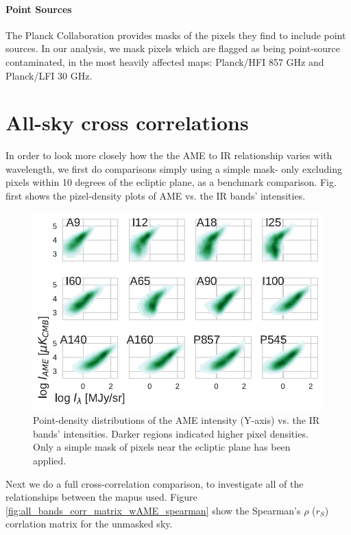      \paragraph{Point Sources}
       The Planck Collaboration provides masks of the pixels they find to include point sources. In our analysis, we mask pixels which are flagged as being point-source contaminated, in the most heavily affected maps: Planck/HFI 857 GHz and Planck/LFI 30 GHz.

  \section{All-sky cross correlations}

        In order to look more closely how the the AME to IR relationship varies with wavelength, we first do comparisons simply using a simple mask- only excluding pixels within 10 degrees of the ecliptic plane, as a benchmark comparison. Fig. first shows the pizel-density plots of AME vs. the IR bands' intensities.
        \begin{figure}
          \includegraphics[width=\textwidth]{../Plots/ch_allsky/AMEvsDust_allsky_allbands_mpsub_kde_unmasked.pdf}
          \centering
          \caption{Point-density distributions of the AME intensity (Y-axis) vs. the IR bands' intensities. Darker regions indicated higher pixel densities. Only a simple mask of pixels near the ecliptic plane has been applied.}
          \label{fig:AMEvsDust_allsky_allbands_mpsub_kde_unmasked}
        \end{figure}
        Next we do a full cross-correlation comparison, to investigate all of the relationships between the mapus used. Figure \ref{fig:all_bands_corr_matrix_wAME_spearman} show the Spearman's $\rho$ ($r_{S}$) corrlation matrix for the unmasked sky.
